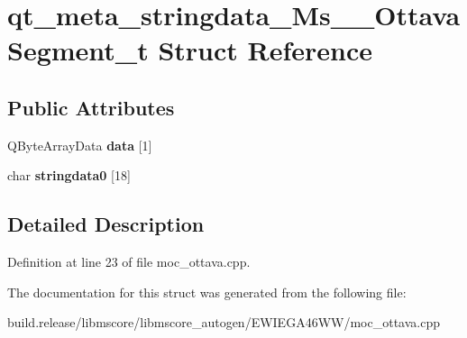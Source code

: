 \hypertarget{structqt__meta__stringdata___ms_____ottava_segment__t}{}\section{qt\+\_\+meta\+\_\+stringdata\+\_\+\+Ms\+\_\+\+\_\+\+Ottava\+Segment\+\_\+t Struct Reference}
\label{structqt__meta__stringdata___ms_____ottava_segment__t}
\subsection*{Public Attributes}
\begin{DoxyCompactItemize}
\item 
\mbox{\label{structqt__meta__stringdata___ms_____ottava_segment__t_a164b8c6f99a5eeaa2d148c0905e9e386}} 
Q\+Byte\+Array\+Data {\bfseries data} \mbox{[}1\mbox{]}
\item 
\mbox{\label{structqt__meta__stringdata___ms_____ottava_segment__t_a28caf3f484ffafd75b75217067dbba30}} 
char {\bfseries stringdata0} \mbox{[}18\mbox{]}
\end{DoxyCompactItemize}


\subsection{Detailed Description}


Definition at line 23 of file moc\+\_\+ottava.\+cpp.



The documentation for this struct was generated from the following file\+:\begin{DoxyCompactItemize}
\item 
build.\+release/libmscore/libmscore\+\_\+autogen/\+E\+W\+I\+E\+G\+A46\+W\+W/moc\+\_\+ottava.\+cpp\end{DoxyCompactItemize}

